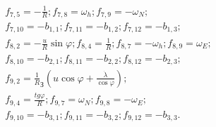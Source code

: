 \begin{equation}
\begin{array}{l}
{f_{7,5}=-\frac{1}{R} ;f_{7,8}=\omega_{h}; f_{7,9}=-\omega_{N} ;}\\
{f_{7,10}=-b_{1,1};f_{7,11}=-b_{1,2};f_{7,12}=-b_{1,3} ;} \\
{f_{8,2} =-\frac{u}{R} \sin \varphi; f_{8,4} =\frac{1}{R};f_{8,7} =-\omega_{h};f_{8,9} =\omega_{E};}\\
{f_{8,10} =-b_{2,1}; f_{8,11} =-b_{2,2}; f_{8,12} =-b_{2,3} ;}\\ 
{f_{9,2} =\frac{1}{R}_{\text{З}} (u\cos \varphi +\frac{\dot{\lambda }}{\cos \varphi });}\\
{f_{9,4} =\frac{tg\varphi }{R}; f_{9,7} =\omega_{N}; f_{9,8} =-\omega_{E};}\\ 
{f_{9,10} =-b_{3,1};f_{9,11} =-b_{3,2};f_{9,12} =-b_{3,3}.}
\end{array}
\end{equation} 


